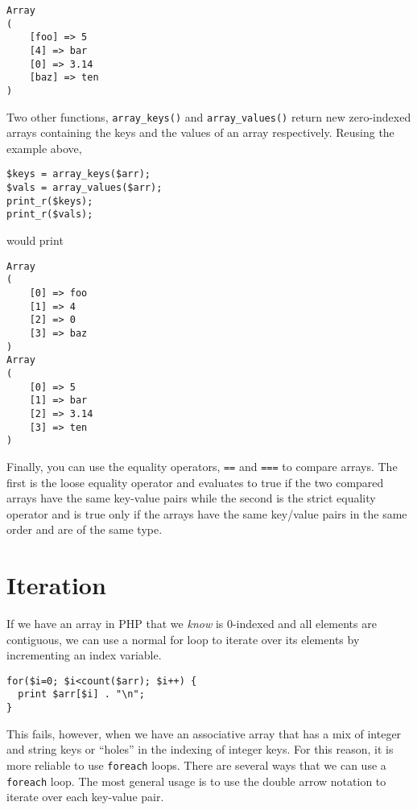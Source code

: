 \begin{verbatim}
Array
(
    [foo] => 5
    [4] => bar
    [0] => 3.14
    [baz] => ten
)
\end{verbatim}

Two other functions, \texttt{array_keys()} and 
\texttt{array_values()} return new zero-indexed
arrays containing the keys and the values of an array 
respectively.  Reusing the example above, 

\begin{verbatim}
$keys = array_keys($arr);
$vals = array_values($arr);
print_r($keys);
print_r($vals);
\end{verbatim}

would print

\begin{verbatim}
Array
(
    [0] => foo
    [1] => 4
    [2] => 0
    [3] => baz
)
Array
(
    [0] => 5
    [1] => bar
    [2] => 3.14
    [3] => ten
)
\end{verbatim}


Finally, you can use the equality operators, 
\texttt{==} and \texttt{===}
to compare arrays.  The first is the loose equality
operator and evaluates to true if the two compared
arrays have the same key-value pairs while the
second is the strict equality operator and is true
only if the arrays have the same key/value pairs in
the same order and are of the same type.

\section{Iteration}

If we have an array in PHP that we \emph{know} is
0-indexed and all elements are contiguous, we can 
use a normal for loop to iterate over its elements
by incrementing an index variable.

\begin{verbatim}
for($i=0; $i<count($arr); $i++) {
  print $arr[$i] . "\n";
}
\end{verbatim}

This fails, however, when we have an associative array
that has a mix of integer and string keys or ``holes'' in
the indexing of integer keys.  For this reason, it is more
reliable to use \texttt{foreach} loops.  There
are several ways that we can use a \texttt{foreach}
loop.  The most general usage is to use the double arrow
notation to iterate over each key-value pair.

